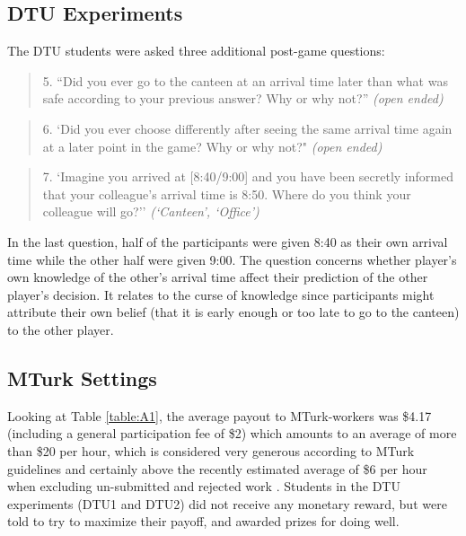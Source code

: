 \documentclass[a4paper,superscriptaddress,nofootinbib]{revtex4}
\begin{document}
\subsection*{DTU Experiments}
The DTU students were asked three additional post-game questions:
\begin{quote}
5. ``Did you ever go to the canteen at an arrival time later than what was safe according
to your previous answer? Why or why not?'' \textit{(open ended)}
\end{quote}
\begin{quote}
6. `Did you ever choose differently after seeing the same arrival time again at a later point
in the game? Why or why not?" \textit{(open ended)}
\end{quote}
\begin{quote}
7. `Imagine you arrived at [8:40/9:00] and you have been secretly informed that your colleague’s arrival time is 8:50. Where do you think your colleague will go?'' \textit{(`Canteen', `Office')}
\end{quote}
In the last question, half of the participants were given 8:40 as their own arrival time while the other half were given 9:00. The question concerns whether player’s own knowledge of the other’s arrival time affect their prediction of the other player’s decision. It relates to the curse of knowledge \cite{birch2007curse} since participants might attribute their own belief (that it is early enough or too late to go to the canteen) to the other player.

\subsection*{MTurk Settings}
\label{MTurksettings}
Looking at Table \ref{table:A1}, the average payout to MTurk-workers was \$4.17 (including a general participation fee of \$2) which amounts to an average of more than \$20 per hour, which is considered very generous according to MTurk guidelines and certainly above the recently estimated average of \$6 per hour when excluding un-submitted and rejected work \cite{HaraEtAl18}. Students in the DTU experiments (DTU1 and DTU2) did not receive any monetary reward, but were told to try to maximize their payoff, and awarded prizes for doing well.
\end{document}
